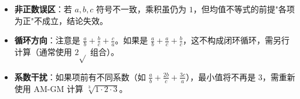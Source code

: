 \begin{trapbox}
\begin{itemize}
    \item \textbf{非正数误区}：若 $a, b, c$ 符号不一致，乘积虽仍为 $1$，但均值不等式的前提"各项为正"不成立，结论失效。
    \item \textbf{循环方向}：注意是 $\frac{a}{b} + \frac{b}{c} + \frac{c}{a}$。如果是 $\frac{a}{b} + \frac{a}{c} + \frac{b}{c}$，这不构成闭环循环，需另行计算（通常使用 $2\sqrt{}$ 组合）。
    \item \textbf{系数干扰}：如果项前有不同系数（如 $\frac{a}{b} + \frac{2b}{c} + \frac{3c}{a}$），最小值将不再是 $3$，需重新使用 AM-GM 计算 $\sqrt[3]{1 \cdot 2 \cdot 3}$。
\end{itemize}
\end{trapbox}